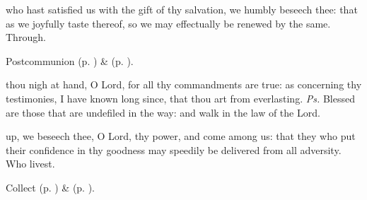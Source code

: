 
\vspace{-0.25\baselineskip}

\postcommunion

\vspace{-0.1\baselineskip}

 who hast satisfied us with the gift of thy salvation, we humbly beseech thee: that as we joyfully taste thereof, so we may effectually be renewed by the same. Through.

\begin{rubric}
     Postcommunion  (p. \pageref{AdventIPostcommunion}) \&   (p. \pageref{SPMaryInAdvent}).
\end{rubric}




\vspace{-0.25\baselineskip}

\introit

\vspace{-0.1\baselineskip}

 thou nigh at hand, O Lord, for all thy commandments are true: as concerning thy testimonies, I have known long since, that thou art from everlasting. \textit{Ps.} Blessed are those that are undefiled in the way: and walk in the law of the Lord.

\vspace{-0.25\baselineskip}

\collect

\vspace{-0.1\baselineskip}

 up, we beseech thee, O Lord, thy power, and come among us: that they who put their confidence in thy goodness may speedily be delivered from all adversity. Who livest.

\begin{rubric}
     Collect  (p. \pageref{AdventICollect}) \&   (p. \pageref{SPMaryInAdvent}).
\end{rubric}

